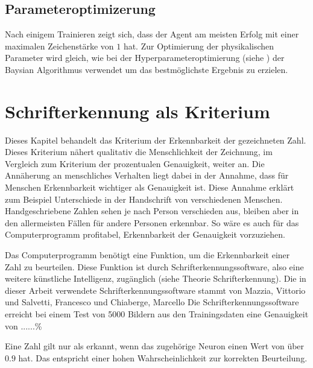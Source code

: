 
\subsection*{Parameteroptimizerung}
Nach einigem Trainieren zeigt sich, dass der Agent am meisten Erfolg mit einer
maximalen Zeichenstärke von $1$ hat. Zur Optimierung der physikalischen
Parameter wird gleich, wie bei der Hyperparameteroptimierung (siehe %
) der Baysian Algorithmus verwendet um
das bestmöglichste Ergebnis zu erzielen.





\section{Schrifterkennung als Kriterium}
Dieses Kapitel behandelt das Kriterium der Erkennbarkeit der gezeichneten Zahl.
Dieses Kriterium nähert qualitativ die Menschlichkeit der Zeichnung, im
Vergleich zum Kriterium der prozentualen Genauigkeit, weiter an. Die Annäherung
an menschliches Verhalten liegt dabei in der Annahme, dass für Menschen
Erkennbarkeit wichtiger als Genauigkeit ist. Diese Annahme erklärt zum Beispiel
Unterschiede in der Handschrift von verschiedenen Menschen. Handgeschriebene
Zahlen sehen je nach Person verschieden aus, bleiben aber in den allermeisten
Fällen für andere Personen erkennbar. So wäre es auch für das Computerprogramm
profitabel, Erkennbarkeit der Genauigkeit vorzuziehen.

Das Computerprogramm benötigt eine Funktion, um die Erkennbarkeit einer Zahl zu
beurteilen. Diese Funktion ist durch Schrifterkennungssoftware, also eine
weitere künstliche Intelligenz, zugänglich (siehe Theorie Schrifterkennung). Die  %
in dieser Arbeit verwendete Schrifterkennungssoftware stammt von Mazzia,
Vittorio und Salvetti, Francesco und Chiaberge, Marcello
\cite{mazzia_salvetti_efficient-capsnet_2021} Die Schrifterkennungssoftware
erreicht bei einem Test von 5000 Bildern aus den Trainingsdaten eine Genauigkeit
von ......\%

Eine Zahl gilt nur als erkannt, wenn das zugehörige Neuron einen Wert von über $0.9$
hat. Das entspricht einer hohen Wahrscheinlichkeit zur korrekten Beurteilung. 

